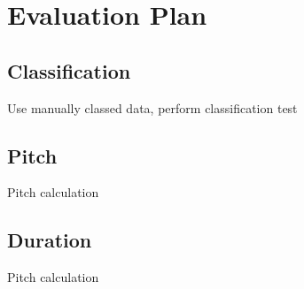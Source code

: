 \section{Evaluation Plan}


\subsection{Classification}

Use manually classed data, perform classification test

\subsection{Pitch}
Pitch calculation

\subsection{Duration}
Pitch calculation
